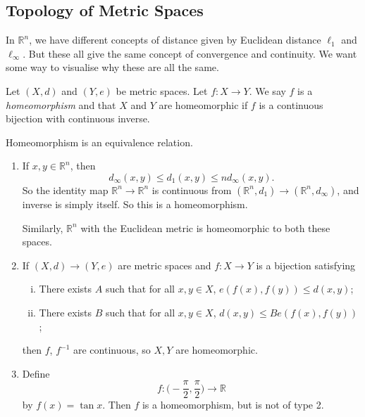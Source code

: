 \documentclass[12pt]{article}
\begin{document}
\subsection{Topology of Metric Spaces}%
\label{sub:topology_of_metric_spaces}

In $\mathbb{R}^{n}$, we have different concepts of distance given by Euclidean distance $\ell_1$ and $\ell_{\infty}$. But these all give the same concept of convergence and continuity. We want some way to visualise why these are all the same.

\begin{definition}
	Let $(X, d)$ and $(Y, e)$ be metric spaces. Let $f : X \to Y$. We say $f$ is a \textit{homeomorphism} and that $X$ and $Y$ are homeomorphic if $f$ is a continuous bijection with continuous inverse.
\end{definition}

\begin{remark}
	Homeomorphism is an equivalence relation.
\end{remark}

\begin{exbox}
	\begin{enumerate}[1.]
		\item If $x, y \in \mathbb{R}^{n}$, then
			\[
				d_{\infty}(x, y) \leq d_1(x, y) \leq n d_{\infty}(x, y)
			.\]
			So the identity map $\mathbb{R}^{n} \to \mathbb{R}^{n}$ is continuous from $(\mathbb{R}^{n}, d_1 ) \to (\mathbb{R}^{n}, d_{\infty})$, and inverse is simply itself. So this is a homeomorphism.

			Similarly, $\mathbb{R}^{n}$ with the Euclidean metric is homeomorphic to both these spaces.
		\item If $(X, d) \to (Y, e)$ are metric spaces and $f : X \to Y$ is a bijection satisfying
			\begin{enumerate}[(i)]
				\item There exists $A$ such that for all $x, y \in X$, $e(f(x), f(y)) \leq d(x, y)$;
				\item There exists $B$ such that for all $x, y \in X$, $d(x, y) \leq Be(f(x), f(y))$;
			\end{enumerate}
			then $f$, $f^{-1}$ are continuous, so $X, Y$ are homeomorphic.
		\item Define
			\[
				f : \biggl( - \frac{\pi}{2} , \frac{\pi}{2} \biggr) \to \mathbb{R}
			\]
			by $f(x) = \tan x$. Then $f$ is a homeomorphism, but is not of type 2.
	\end{enumerate}
\end{exbox}
\end{document}
